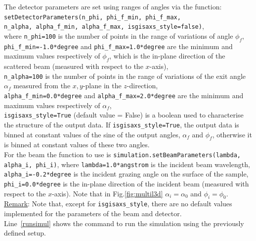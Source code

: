\noindent The detector parameters are set using ranges of angles via
the function:\\

\noindent \texttt{setDetectorParameters(n\_phi, phi\_f\_min,
  phi\_f\_max,\\ \phantom{setDetectorParameters(}n\_alpha, alpha\_f\_min, alpha\_f\_max, isgisaxs\_style=false)}, \\

\noindent where \texttt{n\_phi=100} is the number of points in the range of
variations of angle $\phi_f$,\\ \texttt{phi\_f\_min=-1.0*degree} and \texttt{phi\_f\_max=1.0*degree}
are the minimum and maximum values respectively of $\phi_f$, which is the in-plane direction of the scattered beam
(measured with respect to the $x$-axis), \\ \texttt{n\_alpha=100} is
the number of points in the range of variations of the exit angle
$\alpha_f$ measured from the $x,y$-plane in the $z$-direction,\\ \texttt{alpha\_f\_min=0.0*degree} and \texttt{alpha\_f\_max=2.0*degree} 
are the minimum and maximum values respectively of $\alpha_f$,\\
\texttt{isgisaxs\_style=True} (default value = False) is a boolean
used to characterise the structure of the output data. If
\texttt{isgisaxs\_style=True}, the output data is binned at constant
values of the sine of the output angles, $\alpha_f$ and $\phi_f$, otherwise it is binned
at constant values of these two angles.\\


\noindent For the beam the function to use is
\texttt{simulation.setBeamParameters(lambda, alpha\_i, phi\_i)}, where
\texttt{lambda=1.0*angstrom} is the incident beam wavelength,\\
\texttt{alpha\_i=-0.2*degree} is the incident
grazing angle on the surface of the sample,
\texttt{phi\_i=0.0*degree} is the in-plane
direction of the incident beam (measured with respect to the
$x$-axis). Note that in Fig.\ref{fig:multil3d} $\alpha_i=\alpha_0$ and $\phi_i=\phi_0$.\\ 

\noindent \underline{Remark}: Note that, except for
\texttt{isgisaxs\_style}, there are no default values implemented for the
parameters of the beam and detector.\\

\noindent Line~\ref{runsimul} shows the command to run the simulation using the
previously defined setup.


